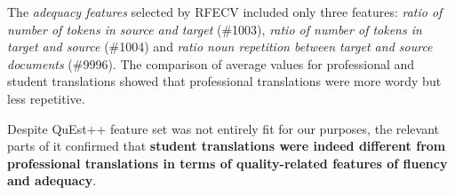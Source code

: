 \label{pg:quest_adequacy_feats_for_vars}
The \textit{adequacy features} selected by RFECV included only three features: \textit{ratio of number of tokens in source and target} (\#1003), \textit{ratio of number of tokens in target and source} (\#1004) and \textit{ratio noun repetition between target and source documents} (\#9996). The comparison of average values for professional and student translations showed that professional translations were more wordy but less repetitive. 

Despite QuEst++ feature set was not entirely fit for our purposes, the relevant parts of it confirmed that \textbf{student translations were indeed different from professional translations in terms of quality-related features of fluency and adequacy}.


